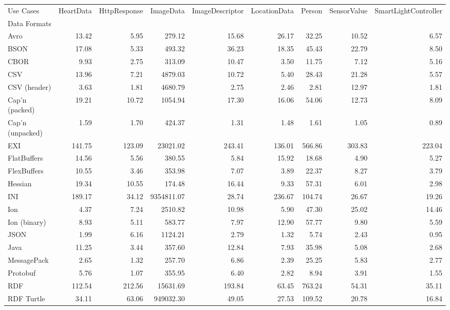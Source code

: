 \begin{tabular}{lrrrrrrrr}
Use Cases & HeartData & HttpResponse & ImageData & ImageDescriptor & LocationData & Person & SensorValue & SmartLightController \\
Data Formats &  &  &  &  &  &  &  &  \\
Avro & 13.42 & 5.95 & 279.12 & 15.68 & 26.17 & 32.25 & 10.52 & 6.57 \\
BSON & 17.08 & 5.33 & 493.32 & 36.23 & 18.35 & 45.43 & 22.79 & 8.50 \\
CBOR & 9.93 & 2.75 & 313.09 & 10.47 & 3.50 & 11.75 & 7.12 & 5.16 \\
CSV & 13.96 & 7.21 & 4879.03 & 10.72 & 5.40 & 28.43 & 21.28 & 5.57 \\
CSV (header) & 3.63 & 1.81 & 4680.79 & 2.75 & 2.46 & 2.81 & 12.97 & 1.81 \\
Cap'n (packed) & 19.21 & 10.72 & 1054.94 & 17.30 & 16.06 & 54.06 & 12.73 & 8.09 \\
Cap'n (unpacked) & 1.59 & 1.70 & 424.37 & 1.31 & 1.48 & 1.61 & 1.05 & 0.89 \\
EXI & 141.75 & 123.09 & 23021.02 & 243.41 & 136.01 & 566.86 & 303.83 & 223.04 \\
FlatBuffers & 14.56 & 5.56 & 380.55 & 5.84 & 15.92 & 18.68 & 4.90 & 5.27 \\
FlexBuffers & 10.55 & 3.46 & 353.98 & 7.07 & 3.89 & 22.37 & 8.27 & 3.79 \\
Hessian & 19.34 & 10.55 & 174.48 & 16.44 & 9.33 & 57.31 & 6.01 & 2.98 \\
INI & 189.17 & 34.12 & 9354811.07 & 28.74 & 236.67 & 104.74 & 26.67 & 19.26 \\
Ion & 4.37 & 7.24 & 2510.82 & 10.98 & 5.90 & 47.30 & 25.02 & 14.46 \\
Ion (binary) & 8.93 & 5.11 & 583.77 & 7.97 & 12.90 & 57.77 & 9.80 & 5.59 \\
JSON & 1.99 & 6.16 & 1124.21 & 2.79 & 1.32 & 5.74 & 2.43 & 0.95 \\
Java & 11.25 & 3.44 & 357.60 & 12.84 & 7.93 & 35.98 & 5.08 & 2.68 \\
MessagePack & 2.65 & 1.32 & 257.70 & 6.86 & 2.39 & 25.25 & 5.83 & 2.77 \\
Protobuf & 5.76 & 1.07 & 355.95 & 6.40 & 2.82 & 8.94 & 3.91 & 1.55 \\
RDF & 112.54 & 212.56 & 15631.69 & 193.84 & 63.45 & 763.24 & 54.31 & 35.11 \\
RDF Turtle & 34.11 & 63.06 & 949032.30 & 49.05 & 27.53 & 109.52 & 20.78 & 16.84 \\

\end{tabular}
